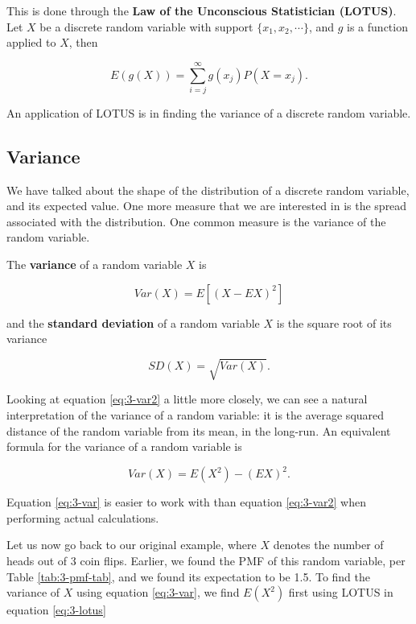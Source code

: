 \documentclass[
]{book}
\begin{document}
This is done through the \textbf{Law of the Unconscious Statistician (LOTUS)}. Let \(X\) be a discrete random variable with support \(\{x_1, x_2, \cdots \}\), and \(g\) is a function applied to \(X\), then

\begin{equation} 
E(g(X)) = \sum_{i=j}^{\infty} g(x_j) P(X=x_j).
\label{eq:3-lotus}
\end{equation}

An application of LOTUS is in finding the variance of a discrete random variable.

\hypertarget{variance}{%
\subsection{Variance}\label{variance}}

We have talked about the shape of the distribution of a discrete random variable, and its expected value. One more measure that we are interested in is the spread associated with the distribution. One common measure is the variance of the random variable.

The \textbf{variance} of a random variable \(X\) is

\begin{equation} 
Var(X) = E[(X - EX)^2]
\label{eq:3-var2}
\end{equation}

and the \textbf{standard deviation} of a random variable \(X\) is the square root of its variance

\begin{equation} 
SD(X) = \sqrt{Var(X)}.
\label{eq:3-sd}
\end{equation}

Looking at equation \eqref{eq:3-var2} a little more closely, we can see a natural interpretation of the variance of a random variable: it is the average squared distance of the random variable from its mean, in the long-run. An equivalent formula for the variance of a random variable is

\begin{equation} 
Var(X) = E(X^2) - (EX)^2.
\label{eq:3-var}
\end{equation}

Equation \eqref{eq:3-var} is easier to work with than equation \eqref{eq:3-var2} when performing actual calculations.

Let us now go back to our original example, where \(X\) denotes the number of heads out of 3 coin flips. Earlier, we found the PMF of this random variable, per Table \ref{tab:3-pmf-tab}, and we found its expectation to be 1.5. To find the variance of \(X\) using equation \eqref{eq:3-var}, we find \(E(X^2)\) first using LOTUS in equation \eqref{eq:3-lotus}
\end{document}
